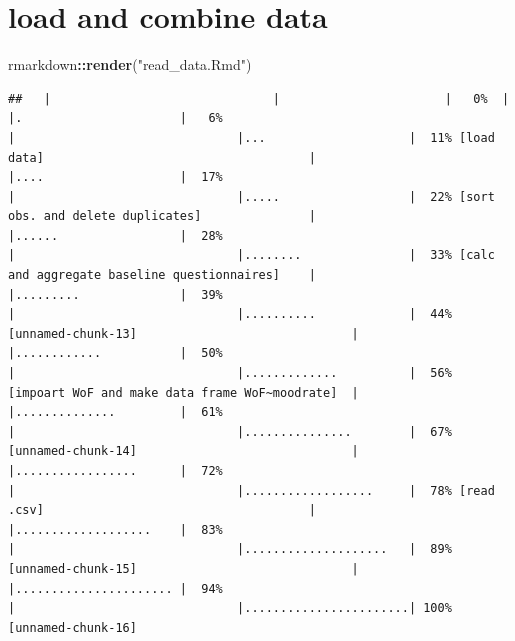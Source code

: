 \documentclass[
]{article}
\newenvironment{Shaded}{\begin{snugshade}}{\end{snugshade}}
\newcommand{\FunctionTok}[1]{\textcolor[rgb]{0.13,0.29,0.53}{\textbf{#1}}}
\newcommand{\NormalTok}[1]{#1}
\newcommand{\SpecialCharTok}[1]{\textcolor[rgb]{0.81,0.36,0.00}{\textbf{#1}}}
\newcommand{\StringTok}[1]{\textcolor[rgb]{0.31,0.60,0.02}{#1}}
\begin{document}
\hypertarget{load-and-combine-data}{%
\section{load and combine data}\label{load-and-combine-data}}

\begin{Shaded}
\begin{Highlighting}[]
\NormalTok{rmarkdown}\SpecialCharTok{::}\FunctionTok{render}\NormalTok{(}\StringTok{"read\_data.Rmd"}\NormalTok{)}
\end{Highlighting}
\end{Shaded}

\begin{verbatim}
##   |                               |                       |   0%  |                               |.                      |   6%                                                 |                               |...                    |  11% [load data]                                     |                               |....                   |  17%                                                 |                               |.....                  |  22% [sort obs. and delete duplicates]               |                               |......                 |  28%                                                 |                               |........               |  33% [calc and aggregate baseline questionnaires]    |                               |.........              |  39%                                                 |                               |..........             |  44% [unnamed-chunk-13]                              |                               |............           |  50%                                                 |                               |.............          |  56% [impoart WoF and make data frame WoF~moodrate]  |                               |..............         |  61%                                                 |                               |...............        |  67% [unnamed-chunk-14]                              |                               |.................      |  72%                                                 |                               |..................     |  78% [read .csv]                                     |                               |...................    |  83%                                                 |                               |....................   |  89% [unnamed-chunk-15]                              |                               |...................... |  94%                                                 |                               |.......................| 100% [unnamed-chunk-16]                                                                                                                                                                     

\end{verbatim}
\end{document}

